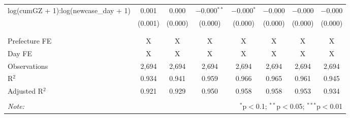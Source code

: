 \begin{table}[!htbp]
\begin{tabular}{@{\extracolsep{5pt}}lccccccc}
 log(cumGZ + 1):log(newcase\_day + 1) & 0.001 & 0.000 & $-$0.000$^{**}$ & $-$0.000$^{*}$ & $-$0.000 & $-$0.000 & $-$0.000 \\ 
  & (0.001) & (0.000) & (0.000) & (0.000) & (0.000) & (0.000) & (0.000) \\ 
  & & & & & & & \\ 
\hline \\[-1.8ex] 
Prefecture FE & X & X & X & X & X & X & X \\ 
Day FE & X & X & X & X & X & X & X \\ 
Observations & 2,694 & 2,694 & 2,694 & 2,694 & 2,694 & 2,694 & 2,694 \\ 
R$^{2}$ & 0.934 & 0.941 & 0.959 & 0.966 & 0.965 & 0.961 & 0.945 \\ 
Adjusted R$^{2}$ & 0.921 & 0.929 & 0.950 & 0.958 & 0.958 & 0.953 & 0.934 \\ 
\hline 
\hline \\[-1.8ex] 
\textit{Note:}  & \multicolumn{7}{r}{$^{*}$p$<$0.1; $^{**}$p$<$0.05; $^{***}$p$<$0.01} \\ 
\end{tabular} 
\end{table} 
